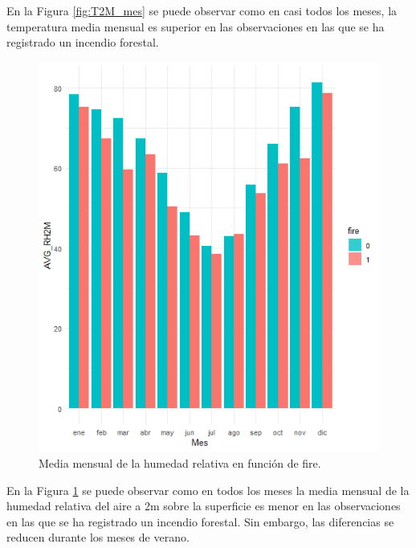 \documentclass[12pt,a4paper,]{book}
\numberwithin{dummy}{section}
\theoremstyle{ocrenumbox}
\theoremstyle{blacknumex}
\theoremstyle{blacknumbox}
\theoremstyle{ocrenum}
\theoremstyle{ocrenum}
\begin{document}
En la Figura \ref{fig:T2M_mes} se puede observar como en casi todos los
meses, la temperatura media mensual es superior en las observaciones en
las que se ha registrado un incendio forestal.

\begin{figure}[h]
\centering
\includegraphics[width =\textwidth]{graficos/RH2M_mes.png}
\caption{Media mensual de la humedad relativa en función de fire.}
\label{fig:RH2M_mes}
\end{figure}

En la Figura \ref{fig:RH2M_mes} se puede observar como en todos los
meses la media mensual de la humedad relativa del aire a 2m sobre la
superficie es menor en las observaciones en las que se ha registrado un
incendio forestal. Sin embargo, las diferencias se reducen durante los
meses de verano.
\end{document}
